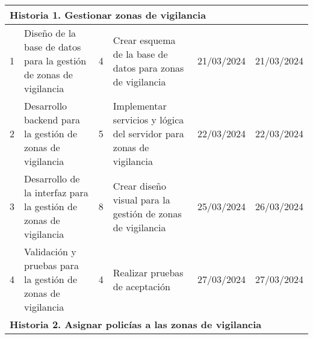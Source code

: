 \begin{longtable}{|p{0.5cm}|p{2cm}|p{1cm}|p{3cm}|p{1cm}|p{1cm}|}
    \multicolumn{6}{|l|}{\textbf{Historia 1. Gestionar zonas de vigilancia}}                                                                                                                                                                                                                                                                                                                               \\ \hline
    1                                        & Diseño de la base de datos para la gestión de zonas de vigilancia          & 4                                                              & Crear esquema de la base de datos para zonas de vigilancia              & 21/03/2024                                                    & 21/03/2024                                                          \\ \hline
    2                                        & Desarrollo backend para la gestión de zonas de vigilancia                  & 5                                                              & Implementar servicios y lógica del servidor para zonas de vigilancia    & 22/03/2024                                                    & 22/03/2024                                                          \\ \hline
    3                                        & Desarrollo de la interfaz para la gestión de zonas de vigilancia           & 8                                                              & Crear diseño visual para la gestión de zonas de vigilancia              & 25/03/2024                                                    & 26/03/2024                                                          \\ \hline
    4                                        & Validación y pruebas para la gestión de zonas de vigilancia                & 4                                                              & Realizar pruebas de aceptación                                          & 27/03/2024                                                    & 27/03/2024                                                          \\ \hline
    \multicolumn{6}{|l|}{\textbf{Historia 2. Asignar policías a las zonas de vigilancia}}                                                                                                                                                                                                                                                                                                                  \\ \hline

\end{longtable}
